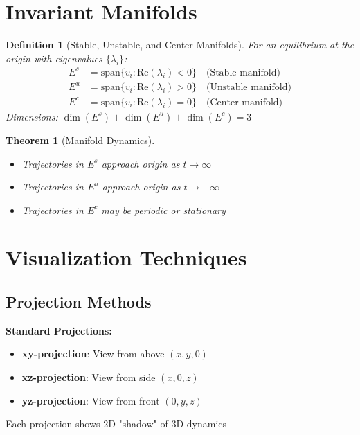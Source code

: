 \documentclass[12pt]{article}
\newtheorem{definition}{Definition}
\newtheorem{theorem}{Theorem}
\begin{document}
\section{Invariant Manifolds}

\begin{definition}[Stable, Unstable, and Center Manifolds]
For an equilibrium at the origin with eigenvalues $\{\lambda_{i}\}$:
\begin{align}
E^{s} &= \text{span}\{v_{i} : \text{Re}(\lambda_{i}) < 0\} \quad \text{(Stable manifold)} \\
E^{u} &= \text{span}\{v_{i} : \text{Re}(\lambda_{i}) > 0\} \quad \text{(Unstable manifold)} \\
E^{c} &= \text{span}\{v_{i} : \text{Re}(\lambda_{i}) = 0\} \quad \text{(Center manifold)}
\end{align}
Dimensions: $\dim(E^{s}) + \dim(E^{u}) + \dim(E^{c}) = 3$
\end{definition}

\begin{theorem}[Manifold Dynamics]
\begin{itemize}
    \item Trajectories in $E^{s}$ approach origin as $t \to \infty$
    \item Trajectories in $E^{u}$ approach origin as $t \to -\infty$
    \item Trajectories in $E^{c}$ may be periodic or stationary
\end{itemize}
\end{theorem}

\section{Visualization Techniques}

\subsection{Projection Methods}

\begin{visualization}
\textbf{Standard Projections:}
\begin{itemize}
    \item \textbf{xy-projection}: View from above $(x,y,0)$
    \item \textbf{xz-projection}: View from side $(x,0,z)$
    \item \textbf{yz-projection}: View from front $(0,y,z)$
\end{itemize}
Each projection shows 2D "shadow" of 3D dynamics
\end{visualization}
\end{document}
